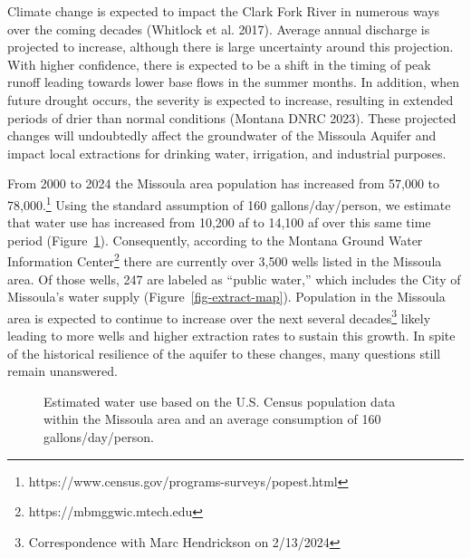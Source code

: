 \documentclass[a4paper, 12pt]{report}
\begin{document}
Climate change is expected to impact the Clark Fork River in numerous
ways over the coming decades (Whitlock et al. 2017). Average annual
discharge is projected to increase, although there is large uncertainty
around this projection. With higher confidence, there is expected to be
a shift in the timing of peak runoff leading towards lower base flows in
the summer months. In addition, when future drought occurs, the severity
is expected to increase, resulting in extended periods of drier than
normal conditions (Montana DNRC 2023). These projected changes will
undoubtedly affect the groundwater of the Missoula Aquifer and impact
local extractions for drinking water, irrigation, and industrial
purposes.

From 2000 to 2024 the Missoula area population has increased from 57,000
to 78,000.\footnote{https://www.census.gov/programs-surveys/popest.html}
Using the standard assumption of 160 gallons/day/person, we estimate
that water use has increased from 10,200 af to 14,100 af over this same
time period (Figure~\ref{fig-water-use}). Consequently, according to the
Montana Ground Water Information Center\footnote{https://mbmggwic.mtech.edu}
there are currently over 3,500 wells listed in the Missoula area. Of
those wells, 247 are labeled as ``public water,'' which includes the
City of Missoula's water supply (Figure~\ref{fig-extract-map}).
Population in the Missoula area is expected to continue to increase over
the next several decades\footnote{Correspondence with Marc Hendrickson
  on 2/13/2024} likely leading to more wells and higher extraction rates
to sustain this growth. In spite of the historical resilience of the
aquifer to these changes, many questions still remain unanswered.

\begin{figure}


\caption{\label{fig-water-use}Estimated water use based on the U.S.
Census population data within the Missoula area and an average
consumption of 160 gallons/day/person.}

\end{figure}%
\end{document}
